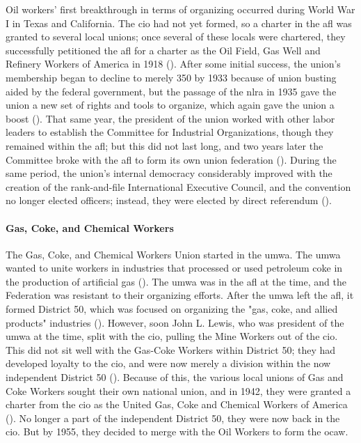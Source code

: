 \documentclass[12pt]{article}
\begin{document}
Oil workers’ first breakthrough in terms of organizing occurred during World War I in Texas and California. The \acrfull{cio} had not yet formed, so a charter in the \acrfull{afl} was granted to several local unions; once several of these locals were chartered, they successfully petitioned the \acrshort{afl} for a charter as the Oil Field, Gas Well and Refinery Workers of America in 1918 (\cite[48]{ocawFactBookOil1960}). After some initial success, the union’s membership began to decline to merely 350 by 1933 because of union busting aided by the federal government, but the passage of the \acrfull{nlra} in 1935 gave the union a new set of rights and tools to organize, which again gave the union a boost (\cite[49]{ocawFactBookOil1960}). That same year, the president of the union worked with other labor leaders to establish the Committee for Industrial Organizations, though they remained within the \acrshort{afl}; but this did not last long, and two years later the Committee broke with the \acrshort{afl} to form its own union federation (\cite[49]{ocawFactBookOil1960}). During the same period, the union’s internal democracy considerably improved with the creation of the rank-and-file International Executive Council, and the convention no longer elected officers; instead, they were elected by direct referendum (\cite[49--50]{ocawFactBookOil1960}).

\paragraph{Gas, Coke, and Chemical Workers}

The Gas, Coke, and Chemical Workers Union started in the \acrfull{umwa}. The \acrshort{umwa} wanted to unite workers in industries that processed or used petroleum coke in the production of artificial gas (\cite[50]{ocawFactBookOil1960}). The \acrshort{umwa} was in the \acrshort{afl} at the time, and the Federation was resistant to their organizing efforts. After the \acrshort{umwa} left the \acrshort{afl}, it formed District 50, which was focused on organizing the "gas, coke, and allied products" industries (\cite[50--51]{ocawFactBookOil1960}). However, soon John L. Lewis, who was president of the \acrshort{umwa} at the time, split with the \acrshort{cio}, pulling the Mine Workers out of the \acrshort{cio}. This did not sit well with the Gas-Coke Workers within District 50; they had developed loyalty to the \acrshort{cio}, and were now merely a division within the now independent District 50 (\cite[51]{ocawFactBookOil1960}). Because of this, the various local unions of Gas and Coke Workers sought their own national union, and in 1942, they were granted a charter from the \acrshort{cio} as the United Gas, Coke and Chemical Workers of America (\cite[51]{ocawFactBookOil1960}). No longer a part of the independent District 50, they were now back in the \acrshort{cio}. But by 1955, they decided to merge with the Oil Workers to form the \acrfull{ocaw}.
\end{document}
